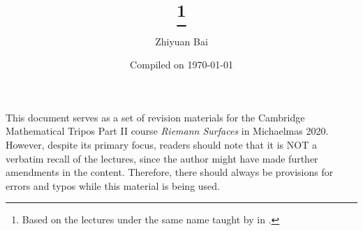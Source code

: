 \documentclass[a4paper]{article}
\title{\triposcourse{}
\thanks{Based on the lectures under the same name taught by \triposlecturer{} in \triposterm{}.}}
\author{Zhiyuan Bai}
\date{Compiled on \today}
\newcommand{\triposcourse}{Riemann Surfaces}
\newcommand{\triposterm}{Michaelmas 2020}
\newcommand{\tripospart}{II}
\theoremstyle{plain}
\theoremstyle{definition}
\theoremstyle{remark}
\begin{document}
    \maketitle
    This document serves as a set of revision materials for the Cambridge Mathematical Tripos Part \tripospart{} course \textit{\triposcourse{}} in \triposterm{}.
    However, despite its primary focus, readers should note that it is NOT a verbatim recall of the lectures, since the author might have made further amendments in the content.
    Therefore, there should always be provisions for errors and typos while this material is being used.
    \tableofcontents
    
    
    
    
    
    
    
    
    
    
    
    
    
    
    
    
    
    
    
    
    
    
    
    
    
    
    
    
    
    
    
    
    
    
    
    
    
    
    
\end{document}
